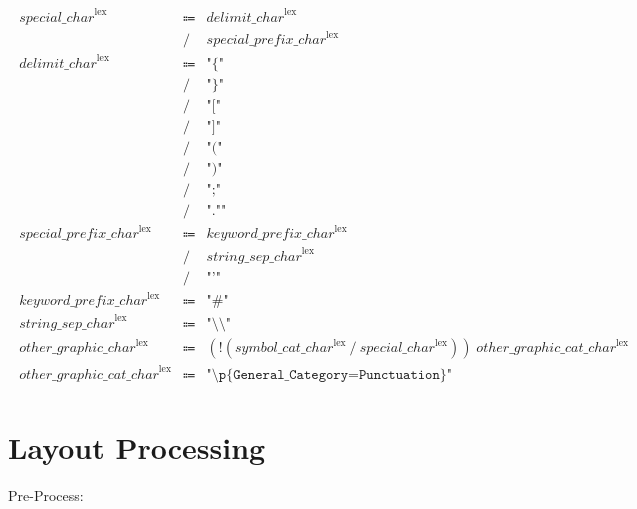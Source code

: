 \begin{align*}
    \begin{array}{rcll}
        \mathit{special\_char}^\mathrm{lex}
        &\Coloneq &\mathit{delimit\_char}^\mathrm{lex} \\
        &\mathrel{/} &\mathit{special\_prefix\_char}^\mathrm{lex} \\
        \mathit{delimit\_char}^\mathrm{lex}
        &\Coloneq &\texttt{"\{"} \\
        &\mathrel{/} &\texttt{"\}"} \\
        &\mathrel{/} &\texttt{"["} \\
        &\mathrel{/} &\texttt{"]"} \\
        &\mathrel{/} &\texttt{"("} \\
        &\mathrel{/} &\texttt{")"} \\
        &\mathrel{/} &\texttt{";"} \\
        &\mathrel{/} &\texttt{".""} \\
        \mathit{special\_prefix\_char}^\mathrm{lex}
        &\Coloneq &\mathit{keyword\_prefix\_char}^\mathrm{lex} \\
        &\mathrel{/} &\mathit{string\_sep\_char}^\mathrm{lex} \\
        &\mathrel{/} &\texttt{"'"} \\
        \mathit{keyword\_prefix\_char}^\mathrm{lex}
        &\Coloneq &\texttt{"\#"} \\
        \mathit{string\_sep\_char}^\mathrm{lex}
        &\Coloneq &\texttt{"\textbackslash \textbackslash "} \\
        \mathit{other\_graphic\_char}^\mathrm{lex}
        &\Coloneq &(\mathop{!} (\mathit{symbol\_cat\_char}^\mathrm{lex} \mathrel{/} \mathit{special\_char}^\mathrm{lex}))\; \mathit{other\_graphic\_cat\_char}^\mathrm{lex} \\
        \mathit{other\_graphic\_cat\_char}^\mathrm{lex}
        &\Coloneq &\texttt{"\textbackslash p\{General\_Category=Punctuation\}"}
    \end{array}
\end{align*}

\section{Layout Processing}

Pre-Process:

